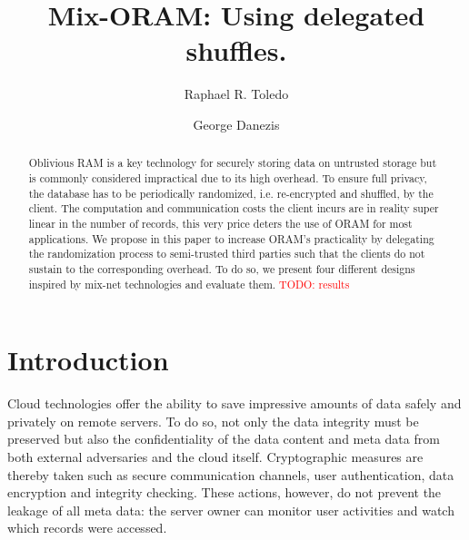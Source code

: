 \documentclass[USenglish,oneside,twocolumn]{article}
\newcommand{\todo}[1]{\textcolor{red}{TODO: #1}}
\begin{document}
 
\author[1]{Raphael R. Toledo}

\author[2]{George Danezis}



  \title{Mix-ORAM: Using delegated shuffles.}

  \begin{abstract}
{
Oblivious RAM is a key technology for securely storing data on untrusted storage but is commonly considered impractical due to its high overhead. To ensure full privacy, the database has to be periodically randomized, i.e. re-encrypted and shuffled, by the client. The computation and communication costs the client incurs are in reality super linear in the number of records, this very price deters the use of ORAM for most applications. We propose in this paper to increase ORAM's practicality by delegating the randomization process to semi-trusted third parties such that the clients do not sustain to the corresponding overhead. To do so, we present four different designs inspired by mix-net technologies and evaluate them. \todo{results}
}
\end{abstract}



\maketitle
%
\section{Introduction}\label{Introduction}
%

Cloud technologies offer the ability to save impressive amounts of data safely and privately on remote servers. To do so, not only the data integrity must be preserved but also the confidentiality of the data content and meta data from both external adversaries and the cloud itself.
Cryptographic measures are thereby taken such as secure communication channels, user authentication, data encryption and integrity checking.
These actions, however, do not prevent the leakage of all meta data: the server owner can monitor user activities and watch which records were accessed. \\
\end{document}
